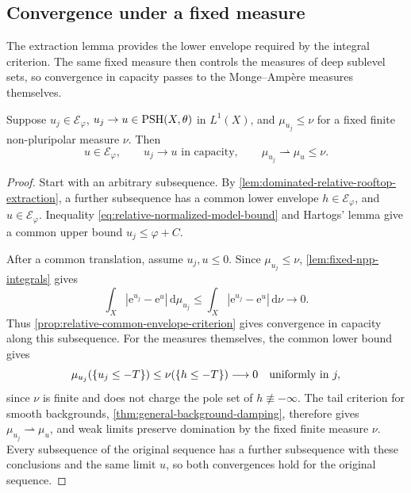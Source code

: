 \subsection{Convergence under a fixed measure}

The extraction lemma provides the lower envelope required by the integral criterion. The same fixed measure then controls the measures of deep sublevel sets, so convergence in capacity passes to the Monge--Amp\`ere measures themselves.

\begin{theorem}\label{thm:relative-fixed-measure-continuity}\label{thm:relative-dominated-continuity}
Suppose $u_j\in\mathcal E_\varphi$, $u_j\to u\in\mathrm{PSH}(X,\theta)$ in $L^1(X)$, and $\mu_{u_j}\leq\nu$ for a fixed finite non-pluripolar measure $\nu$. Then
\[
 u\in\mathcal E_\varphi,
 \qquad u_j\longrightarrow u\text{ in capacity},
 \qquad \mu_{u_j}\rightharpoonup\mu_u\leq\nu.
\]
\end{theorem}
\begin{proof}
Start with an arbitrary subsequence. By \cref{lem:dominated-relative-rooftop-extraction}, a further subsequence has a common lower envelope $h\in\mathcal E_\varphi$, and $u\in\mathcal E_\varphi$. Inequality \eqref{eq:relative-normalized-model-bound} and Hartogs' lemma give a common upper bound $u_j\leq\varphi+C$.

After a common translation, assume $u_j,u\leq0$. Since $\mu_{u_j}\leq\nu$, \cref{lem:fixed-npp-integrals} gives
\[
 \int_X|\mathrm{e}^{u_j}-\mathrm{e}^u|\,\mathrm{d}\mu_{u_j}
 \leq\int_X|\mathrm{e}^{u_j}-\mathrm{e}^u|\,\mathrm{d}\nu
 \longrightarrow0.
\]
Thus \cref{prop:relative-common-envelope-criterion} gives convergence in capacity along this subsequence. For the measures themselves, the common lower bound gives
\[
 \mu_{u_j}(\{u_j\leq-T\})
 \leq\nu(\{h\leq-T\})\longrightarrow0
 \quad\hbox{uniformly in }j,
\]
since $\nu$ is finite and does not charge the pole set of $h\not\equiv-\infty$. The tail criterion for smooth backgrounds, \cref{thm:general-background-damping}, therefore gives $\mu_{u_j}\rightharpoonup\mu_u$, and weak limits preserve domination by the fixed finite measure $\nu$. Every subsequence of the original sequence has a further subsequence with these conclusions and the same limit $u$, so both convergences hold for the original sequence.
\end{proof}
